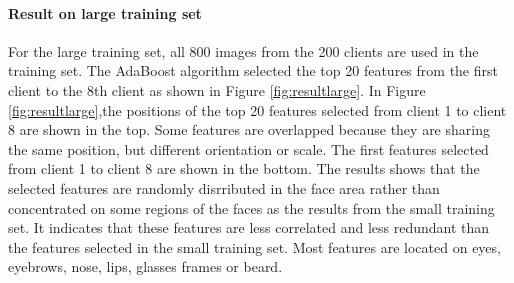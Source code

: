 \paragraph{Result on large training set}For the large training set, all 800 images from the 200 clients are used in the training set. The AdaBoost algorithm selected the top 20 features from the first client to the 8th client as shown in \mbox{Figure} \ref{fig:resultlarge}. In \mbox{Figure} \ref{fig:resultlarge},the positions of the top 20 features selected from client 1 to client 8 are shown in the top. Some features are overlapped because they are sharing the same position, but different orientation or scale. The first features selected from client 1 to client 8 are shown in the bottom. The results shows that the selected features are randomly disrributed in the face area rather than concentrated on some regions of the faces as the results from the small training set. It indicates that these features are less correlated and less redundant than the features selected in the small training set. Most features are located on eyes, eyebrows, nose, lips, glasses frames or beard. 
